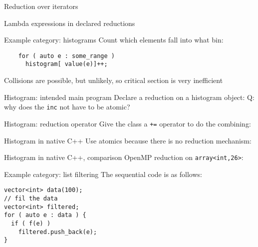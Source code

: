 \documentclass[10pt]{beamer}
\begin{document}
\begin{numberedframe}{Reduction over iterators}
  
\end{numberedframe}

\begin{numberedframe}{Lambda expressions in declared reductions}
  
\end{numberedframe}


\begin{numberedframe}{Example category: histograms}
  Count which elements fall into what bin:
  \begin{lstlisting}
    for ( auto e : some_range )
      histogram[ value(e)]++;
  \end{lstlisting}
  Collisions are possible, but unlikely, so critical section is very inefficient
\end{numberedframe}

\begin{numberedframe}{Histogram: intended main program}
  Declare a reduction on a histogram object:
  Q: why does the \lstinline{inc} not have to be atomic?
\end{numberedframe}

\begin{numberedframe}{Histogram: reduction operator}
  Give the class a \lstinline{+=} operator to do the combining:
  \footnotesize
\end{numberedframe}

\begin{numberedframe}{Histogram in native C++}
  Use atomics because there is no reduction mechanism:
\end{numberedframe}

\begin{numberedframe}{Histogram in native C++, comparison}
  OpenMP reduction on \lstinline{array<int,26>}:
  \footnotesize
  
\end{numberedframe}

\begin{numberedframe}{Example category: list filtering}
The sequential code is as follows:
\begin{lstlisting}
vector<int> data(100);
// fil the data
vector<int> filtered;
for ( auto e : data ) {
  if ( f(e) )
    filtered.push_back(e);
}
\end{lstlisting}
\end{numberedframe}
\end{document}
